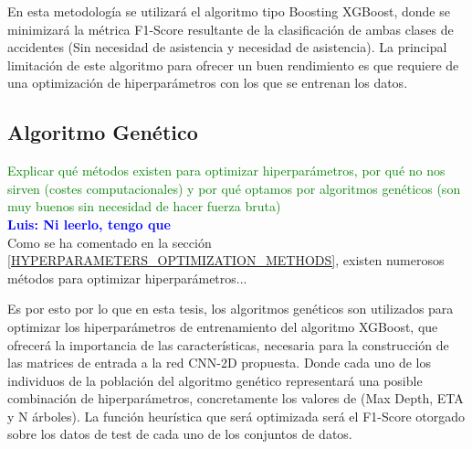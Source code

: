 \documentclass{uathesis-es}
\begin{document}
En esta metodología se utilizará el algoritmo tipo Boosting XGBoost, donde se minimizará la métrica F1-Score resultante de la clasificación de ambas clases de accidentes (Sin necesidad de asistencia y necesidad de asistencia). La principal limitación de este algoritmo para ofrecer un buen rendimiento es que requiere de una optimización de hiperparámetros con los que se entrenan los datos. %


 


\subsection{Algoritmo Genético}
\textcolor{green}{Explicar qué métodos existen para optimizar hiperparámetros, por qué no nos sirven (costes computacionales) y por qué optamos por algoritmos genéticos (son muy buenos sin necesidad de hacer fuerza bruta)}\\

\textcolor{blue}{\textbf{Luis: Ni leerlo, tengo que }}\\

Como se ha comentado en la sección \ref{HYPERPARAMETERS_OPTIMIZATION_METHODS}, existen numerosos métodos para optimizar hiperparámetros...

Es por esto por lo que en esta tesis, los algoritmos genéticos son utilizados para optimizar los hiperparámetros de entrenamiento del algoritmo XGBoost, que ofrecerá la importancia de las características, necesaria para la construcción de las matrices de entrada a la red CNN-2D propuesta. Donde cada uno de los individuos de la población del algoritmo genético representará una posible combinación de hiperparámetros, concretamente los valores de (Max Depth, ETA y N árboles). La función heurística que será optimizada será el F1-Score otorgado sobre los datos de test de cada uno de los conjuntos de datos.
\end{document}
